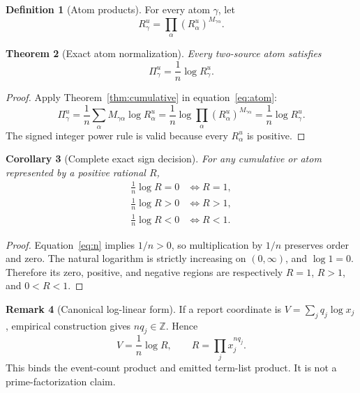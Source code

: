 \documentclass[11pt]{article}
\newtheorem{theorem}{Theorem}[section]
\newtheorem{corollary}[theorem]{Corollary}
\theoremstyle{definition}
\newtheorem{definition}[theorem]{Definition}
\newtheorem{remark}[theorem]{Remark}
\begin{document}
\begin{definition}[Atom products]
For every atom \(\gamma\), let
\begin{equation}\label{eq:atom-product}
R^u_\gamma=\prod_\alpha (R^u_\alpha)^{M_{\gamma\alpha}}.
\end{equation}
\end{definition}

\begin{theorem}[Exact atom normalization]\label{thm:atom}
Every two-source atom satisfies
\begin{equation}\label{eq:atom-normalized}
\Pi^u_\gamma=\frac1n\log R^u_\gamma.
\end{equation}
\end{theorem}

\begin{proof}
Apply Theorem~\ref{thm:cumulative} in equation~\eqref{eq:atom}:
\[
\Pi^u_\gamma
=\frac1n\sum_\alpha M_{\gamma\alpha}\log R^u_\alpha
=\frac1n\log\prod_\alpha (R^u_\alpha)^{M_{\gamma\alpha}}
=\frac1n\log R^u_\gamma.
\]
The signed integer power rule is valid because every \(R^u_\alpha\) is positive.
\end{proof}

\begin{corollary}[Complete exact sign decision]\label{cor:sign}
For any cumulative or atom represented by a positive rational \(R\),
\begin{align}
\frac1n\log R=0&\iff R=1,\label{eq:zero-iff}\\
\frac1n\log R>0&\iff R>1,\label{eq:pos-iff}\\
\frac1n\log R<0&\iff R<1.\label{eq:neg-iff}
\end{align}
\end{corollary}

\begin{proof}
Equation~\eqref{eq:n} implies \(1/n>0\), so multiplication by \(1/n\) preserves order and zero.
The natural logarithm is strictly increasing on \((0,\infty)\), and \(\log 1=0\).  Therefore its
zero, positive, and negative regions are respectively \(R=1\), \(R>1\), and \(0<R<1\).
\end{proof}

\begin{remark}[Canonical log-linear form]
If a report coordinate is \(V=\sum_j q_j\log x_j\), empirical construction gives
\(nq_j\in\mathbb Z\).  Hence
\begin{equation}\label{eq:canonical-product}
V=\frac1n\log R,
\qquad R=\prod_j x_j^{nq_j}.
\end{equation}
This binds the event-count product and emitted term-list product.  It is not a prime-factorization
claim.
\end{remark}
\end{document}
